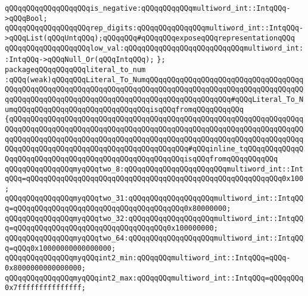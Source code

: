 \verb|qQQqqQQqqQQqqQQqqQQqis_negative:qQQqqQQqqQQqmultiword_int::IntqQQq->qQQqBool;|\newline
\verb|qQQqqQQqqQQqqQQqqQQqrep_digits:qQQqqQQqqQQqqQQqmultiword_int::IntqQQq->qQQqList(qQQqUntqQQq);qQQqqQQq#qQQqqQQqexposeqQQqrepresentationqQQq|\newline
\verb|qQQqqQQqqQQqqQQqqQQqlow_val:qQQqqQQqqQQqqQQqqQQqqQQqqQQqmultiword_int::IntqQQq->qQQqNull_Or(qQQqIntqQQq);|\newline
\verb|};|\newline
\newline
\newline
\newline
\verb|packageqQQqqQQqqQQqliteral_to_num|\newline
\verb|:qQQq(weak)qQQqqQQqLiteral_To_NumqQQqqQQqqQQqqQQqqQQqqQQqqQQqqQQqqQQqqQQqqQQqqQQqqQQqqQQqqQQqqQQqqQQqqQQqqQQqqQQqqQQqqQQqqQQqqQQqqQQqqQQqqQQqqQQqqQQqqQQqqQQqqQQqqQQqqQQqqQQqqQQqqQQqqQQqqQQqqQQq#qQQqLiteral_To_NumqQQqqQQqqQQqqQQqqQQqqQQqqQQqqQQqisqQQqfromqQQqqQQqqQQq|\newline
\verb|{qQQqqQQqqQQqqQQqqQQqqQQqqQQqqQQqqQQqqQQqqQQqqQQqqQQqqQQqqQQqqQQqqQQqqQQqqQQqqQQqqQQqqQQqqQQqqQQqqQQqqQQqqQQqqQQqqQQqqQQqqQQqqQQqqQQqqQQqqQQqqQQqqQQqqQQqqQQqqQQqqQQqqQQqqQQqqQQqqQQqqQQqqQQqqQQqqQQqqQQqqQQqqQQqqQQqqQQqqQQqqQQqqQQqqQQqqQQqqQQqqQQqqQQqqQQq#qQQqinline_tqQQqqQQqqQQqqQQqqQQqqQQqqQQqqQQqqQQqqQQqqQQqqQQqqQQqqQQqisqQQqfromqQQqqQQqqQQq|\newline
\newline
\verb|qQQqqQQqqQQqqQQqmyqQQqtwo_8:qQQqqQQqqQQqqQQqqQQqqQQqmultiword_int::IntqQQq=qQQqqQQqqQQqqQQqqQQqqQQqqQQqqQQqqQQqqQQqqQQqqQQqqQQqqQQqqQQq0x100;|\newline
\verb|qQQqqQQqqQQqqQQqmyqQQqtwo_31:qQQqqQQqqQQqqQQqqQQqmultiword_int::IntqQQq=qQQqqQQqqQQqqQQqqQQqqQQqqQQqqQQqqQQqqQQq0x80000000;|\newline
\verb|qQQqqQQqqQQqqQQqmyqQQqtwo_32:qQQqqQQqqQQqqQQqqQQqmultiword_int::IntqQQq=qQQqqQQqqQQqqQQqqQQqqQQqqQQqqQQqqQQq0x100000000;|\newline
\verb|qQQqqQQqqQQqqQQqmyqQQqtwo_64:qQQqqQQqqQQqqQQqqQQqmultiword_int::IntqQQq=qQQq0x10000000000000000;|\newline
\verb|qQQqqQQqqQQqqQQqmyqQQqint2_min:qQQqqQQqmultiword_int::IntqQQq=qQQq-0x8000000000000000;|\newline
\verb|qQQqqQQqqQQqqQQqmyqQQqint2_max:qQQqqQQqmultiword_int::IntqQQq=qQQqqQQq0x7fffffffffffffff;|\newline
